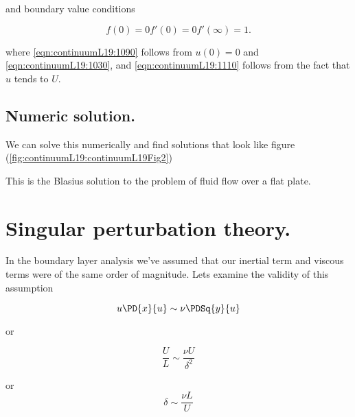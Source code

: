 and boundary value conditions

\begin{subequations}
\begin{equation}\label{eqn:continuumL19:1070}
f(0) = 0
\end{equation}
\begin{equation}\label{eqn:continuumL19:1090}
f'(0) = 0
\end{equation}
\begin{equation}\label{eqn:continuumL19:1110}
f'(\infty) = 1.
\end{equation}
\end{subequations}

where \ref{eqn:continuumL19:1090} follows from $u(0) = 0$ and \ref{eqn:continuumL19:1030}, and \ref{eqn:continuumL19:1110} follows from the fact that $u$ tends to $U$.

\subsection{Numeric solution.}

We can solve this numerically and find solutions that look like figure (\ref{fig:continuumL19:continuumL19Fig2})


This is the Blasius solution to the problem of fluid flow over a flat plate.

\section{Singular perturbation theory.}

In the boundary layer analysis we've assumed that our inertial term and viscous terms were of the same order of magnitude.  Lets examine the validity of this assumption

\begin{equation}\label{eqn:continuumL19:410}
u \PD{x}{u} \sim \nu \PDSq{y}{u}
\end{equation}

or

\begin{equation}\label{eqn:continuumL19:430}
\frac{U}{L} \sim \frac{\nu U}{\delta^2}
\end{equation}

or
\begin{equation}\label{eqn:continuumL19:450}
\delta  \sim \frac{\nu L}{U}
\end{equation}

